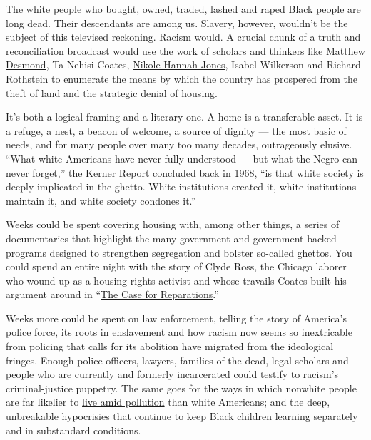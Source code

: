 The white people who bought, owned, traded, lashed and raped Black
people are long dead. Their descendants are among us. Slavery, however,
wouldn't be the subject of this televised reckoning. Racism would. A
crucial chunk of a truth and reconciliation broadcast would use the work
of scholars and thinkers like
\href{https://www.nytimes.com/2016/02/22/books/evicted-book-review-matthew-desmond.html}{Matthew
Desmond}, Ta-Nehisi Coates,
\href{https://www.nytimes.com/interactive/2020/06/24/magazine/reparations-slavery.html}{Nikole
Hannah-Jones}, Isabel Wilkerson and Richard Rothstein to enumerate the
means by which the country has prospered from the theft of land and the
strategic denial of housing.

It's both a logical framing and a literary one. A home is a transferable
asset. It is a refuge, a nest, a beacon of welcome, a source of dignity
--- the most basic of needs, and for many people over many too many
decades, outrageously elusive. ``What white Americans have never fully
understood --- but what the Negro can never forget,'' the Kerner Report
concluded back in 1968, ``is that white society is deeply implicated in
the ghetto. White institutions created it, white institutions maintain
it, and white society condones it.''

Weeks could be spent covering housing with, among other things, a series
of documentaries that highlight the many government and
government-backed programs designed to strengthen segregation and
bolster so-called ghettos. You could spend an entire night with the
story of Clyde Ross, the Chicago laborer who wound up as a housing
rights activist and whose travails Coates built his argument around in
``\href{https://www.theatlantic.com/magazine/archive/2014/06/the-case-for-reparations/361631/}{The
Case for Reparations}.''

Weeks more could be spent on law enforcement, telling the story of
America's police force, its roots in enslavement and how racism now
seems so inextricable from policing that calls for its abolition have
migrated from the ideological fringes. Enough police officers, lawyers,
families of the dead, legal scholars and people who are currently and
formerly incarcerated could testify to racism's criminal-justice
puppetry. The same goes for the ways in which nonwhite people are far
likelier to
\href{https://www.theatlantic.com/politics/archive/2018/02/the-trump-administration-finds-that-environmental-racism-is-real/554315/}{live
amid pollution} than white Americans; and the deep, unbreakable
hypocrisies that continue to keep Black children learning separately and
in substandard conditions.

